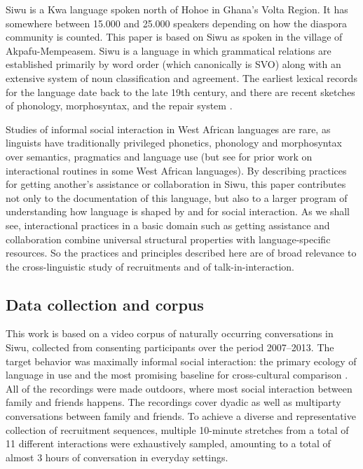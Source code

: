 \documentclass[output=paper]{langsci/langscibook}
\begin{document}
Siwu is a Kwa language spoken north of Hohoe in Ghana’s Volta Region. It has somewhere between 15.000 and 25.000 speakers depending on how the diaspora community is counted. This paper is based on Siwu as spoken in the village of Akpafu-Mempeasem. Siwu is a language in which grammatical relations are established primarily by word order (which canonically is SVO) along with an extensive system of noun classification and agreement. The earliest lexical records for the language date back to the late 19th century, and there are recent sketches of phonology, morphosyntax, and the repair system \citep{kropp_dakubu_central_1988,dingemanse_other-initiated_2015}.

Studies of informal social interaction in West African languages are rare, as linguists have traditionally privileged phonetics, phonology and morphosyntax over semantics, pragmatics and language use (but see \citealt{ameka_ewe_1991,obeng_conversational_1999,meyer_self_2010} for prior work on interactional routines in some West African languages). By describing practices for getting another's assistance or collaboration in Siwu, this paper contributes not only to the documentation of this language, but also to a larger program of understanding how language is shaped by and for social interaction. As we shall see, interactional practices in a basic domain such as getting assistance and collaboration combine universal structural properties with language-specific resources. So the practices and principles described here are of broad relevance to the cross-linguistic study of recruitments and of talk-in-interaction.

\subsection{Data collection and corpus}\label{sec:dingemanse:1.2}

This work is based on a video corpus of naturally occurring conversations in Siwu, collected from consenting participants over the period 2007--2013. The target behavior was maximally informal social interaction: the primary ecology of language in use and the most promising baseline for cross-cultural comparison \citep{dingemanse_conversation_2014}. All of the recordings were made outdoors, where most social interaction between family and friends happens. The recordings cover dyadic as well as multiparty conversations between family and friends. To achieve a diverse and representative collection of recruitment sequences, multiple 10-minute stretches from a total of 11 different interactions were exhaustively sampled, amounting to a total of almost 3 hours of conversation in everyday settings.
\end{document}
